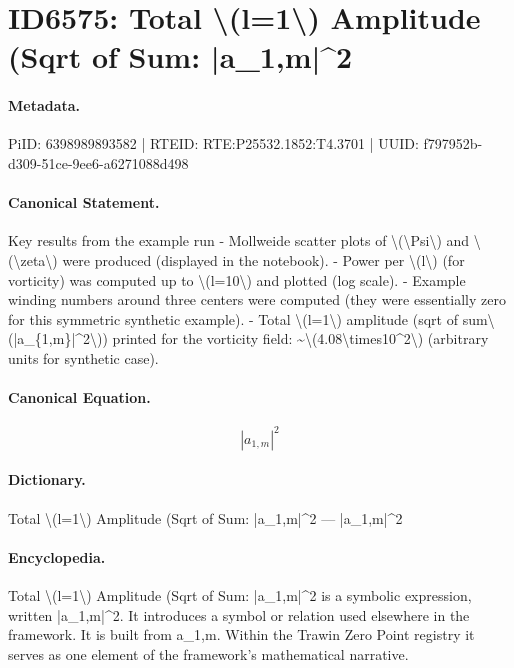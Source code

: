 \section*{ID6575: Total \textbackslash{}(l=1\textbackslash{}) Amplitude (Sqrt of Sum: |a\_1,m|\textasciicircum{}2}
\paragraph{Metadata.}
PiID: 6398989893582 | RTEID: RTE:P25532.1852:T4.3701 | UUID: f797952b-d309-51ce-9ee6-a6271088d498

\paragraph{Canonical Statement.}
Key results from the example run - Mollweide scatter plots of \textbackslash{}(\textbackslash{}Psi\textbackslash{}) and \textbackslash{}(\textbackslash{}zeta\textbackslash{}) were produced (displayed in the notebook). - Power per \textbackslash{}(l\textbackslash{}) (for vorticity) was computed up to \textbackslash{}(l=10\textbackslash{}) and plotted (log scale). - Example winding numbers around three centers were computed (they were essentially zero for this symmetric synthetic example). - Total \textbackslash{}(l=1\textbackslash{}) amplitude (sqrt of sum\textbackslash{}(|a\_\{1,m\}|\textasciicircum{}2\textbackslash{})) printed for the vorticity field: \textasciitilde{}\textbackslash{}(4.08\textbackslash{}times10\textasciicircum{}2\textbackslash{}) (arbitrary units for synthetic case).

\paragraph{Canonical Equation.}
\[
|a_{1,m}|^2
\]

\paragraph{Dictionary.}
Total \textbackslash{}(l=1\textbackslash{}) Amplitude (Sqrt of Sum: |a\_1,m|\textasciicircum{}2 — |a\_1,m|\textasciicircum{}2

\paragraph{Encyclopedia.}
Total \textbackslash{}(l=1\textbackslash{}) Amplitude (Sqrt of Sum: |a\_1,m|\textasciicircum{}2 is a symbolic expression, written |a\_1,m|\textasciicircum{}2. It introduces a symbol or relation used elsewhere in the framework. It is built from a\_1,m. Within the Trawin Zero Point registry it serves as one element of the framework's mathematical narrative.
